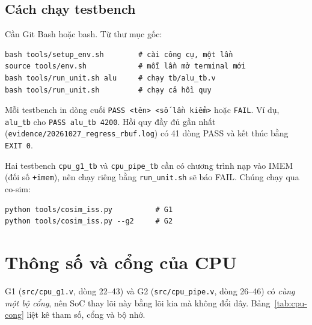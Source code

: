 \subsection{Cách chạy testbench}
Cần Git Bash hoặc bash. Từ thư mục gốc:
\begin{Verbatim}[frame=single,fontsize=\footnotesize]
bash tools/setup_env.sh        # cài công cụ, một lần
source tools/env.sh            # mỗi lần mở terminal mới
bash tools/run_unit.sh alu     # chạy tb/alu_tb.v
bash tools/run_unit.sh         # chạy cả hồi quy
\end{Verbatim}
Mỗi testbench in dòng cuối \texttt{PASS <tên> <số lần kiểm>} hoặc \texttt{FAIL}. Ví dụ, \texttt{alu\_tb} cho \texttt{PASS alu\_tb 4200}. Hồi quy đầy đủ gần nhất (\texttt{evidence/20261027\_regress\_rbuf.log}) có 41 dòng PASS và kết thúc bằng \texttt{EXIT 0}.

Hai testbench \texttt{cpu\_g1\_tb} và \texttt{cpu\_pipe\_tb} cần có chương trình nạp vào IMEM (đối số \texttt{+imem}), nên chạy riêng bằng \texttt{run\_unit.sh} sẽ báo FAIL. Chúng chạy qua co-sim:
\begin{Verbatim}[frame=single,fontsize=\footnotesize]
python tools/cosim_iss.py          # G1
python tools/cosim_iss.py --g2     # G2
\end{Verbatim}

\section{Thông số và cổng của CPU}\label{sec:thong-so}
G1 (\texttt{src/cpu\_g1.v}, dòng 22--43) và G2 (\texttt{src/cpu\_pipe.v}, dòng 26--46) có \emph{cùng một bộ cổng}, nên SoC thay lõi này bằng lõi kia mà không đổi dây. Bảng~\ref{tab:cpu-cong} liệt kê tham số, cổng và bộ nhớ.

